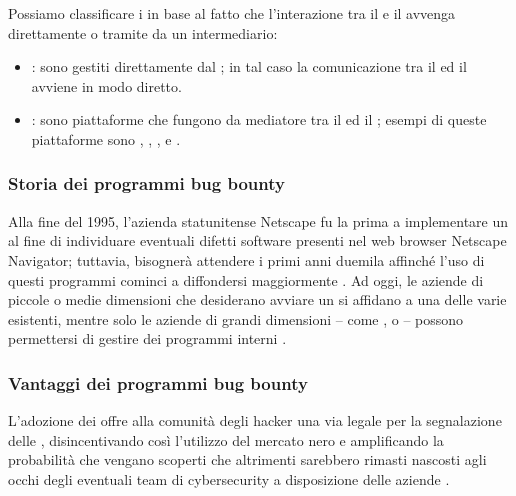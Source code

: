 
Possiamo classificare i \BBP in base al fatto che l'interazione tra il \BI e il \BH avvenga direttamente o tramite da un intermediario:

\begin{itemize}

\item \InternalBBP: sono \BBP gestiti direttamente dal \BI \cite{hoffman2021bountychain}; in tal caso la comunicazione tra il \BI ed il \BH avviene in modo diretto.

\item \BugBountyPlatform: sono piattaforme che fungono da mediatore tra il \BI ed il \BH \cite{hoffman2021bountychain}; 
esempi di queste piattaforme sono \HackerOne, \Intigriti, \Bugcrowd, \Synack e \Yogosha \cite{walshe2023bountythesis3, walshe2020bountypaper}. 

\end{itemize}

\subsubsection{Storia dei programmi bug bounty}

Alla fine del 1995, l'azienda statunitense Netscape fu la prima a implementare un \BBP al fine di individuare eventuali difetti software presenti nel web browser Netscape Navigator; tuttavia, bisognerà attendere i primi anni duemila affinché l'uso di questi programmi cominci a diffondersi maggiormente \cite{hoffman2021bountychain}.
Ad oggi, le aziende di piccole o medie dimensioni che desiderano avviare un \BBP si affidano a una delle varie \bugbountyplatform esistenti, mentre solo le aziende di grandi dimensioni -- come \GoogleBBP, \MetaBBP o {\MicrosoftBBP} -- possono permettersi di gestire dei programmi interni \cite{walshe2023bountythesis3}.

\subsubsection{Vantaggi dei programmi bug bounty}

L'adozione dei \BBP offre alla comunità degli hacker una via legale per la segnalazione delle \vulnerability, disincentivando così l'utilizzo del mercato nero \cite{fryer2017bugbounty, walshe2020bountypaper, walshe2023bountythesis3} e amplificando la probabilità che vengano scoperti \bug che altrimenti sarebbero rimasti nascosti agli occhi degli eventuali team di cybersecurity a disposizione delle aziende \cite{walshe2020bountypaper}.

